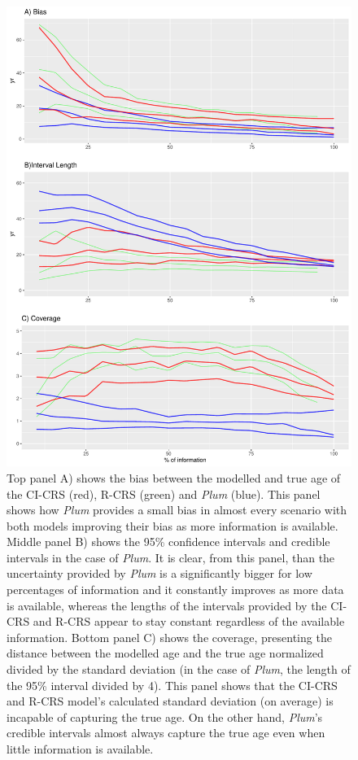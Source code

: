 \documentclass [10pt] {article}
\begin{document}
\begin{figure}[!]
 \centering
  \includegraphics[width=.75\linewidth]{AccPrec.pdf}
	\caption{Top panel A) shows the bias between the modelled and true age of the CI-CRS (red), R-CRS (green) and \textit{Plum} (blue). This panel shows how \textit{Plum} provides a small bias in almost every scenario with both models improving their bias as more information is available. Middle panel B) shows the 95\% confidence intervals and credible intervals in the case of \textit{Plum}. It is clear, from this panel, than the uncertainty provided by \textit{Plum} is a significantly bigger for low percentages of information and it constantly improves as more data is available, whereas the lengths of the intervals provided by the CI-CRS and R-CRS appear to stay constant regardless of the available information. Bottom panel C) shows the coverage, presenting the distance between the modelled age and the true age normalized divided by the standard deviation (in the case of \textit{Plum}, the length of the 95\% interval divided by 4). This panel shows that the CI-CRS and R-CRS model's calculated standard deviation (on average) is incapable of capturing the true age. On the other hand, \textit{Plum}'s credible intervals almost always capture the true age even when little information is available.}
  \label{fig:accpre}
\end{figure}
\end{document}
